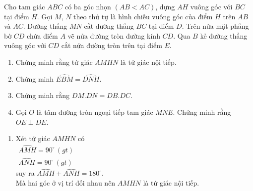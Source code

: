 \begin{bt}%
	Cho tam giác $ABC$ có ba góc nhọn $(AB<AC)$, dựng $AH$ vuông góc với $BC$ tại điểm $H$. Gọi $M$, $N$ theo thứ tự là hình chiếu vuông góc của điểm $H$ trên $AB$ và $AC$. Đường thẳng $MN$ cắt đường thẳng $BC$ tại điểm $D$. Trên nửa mặt phẳng bờ $CD$ chứa điểm $A$ vẽ nửa đường tròn đường kính $CD$. Qua $B$ kẻ đường thẳng vuông góc với $CD$ cắt nửa đường tròn trên tại điểm $E$.
	\begin{enumerate}
		\item Chứng minh rằng tứ giác $AMHN$ là tứ giác nội tiếp.
		\item Chứng minh $\widehat{EBM}=\widehat{DNH}$.
		\item Chứng minh rằng $DM.DN=DB.DC$.
		\item Gọi $O$ là tâm đường tròn ngoại tiếp tam giác $MNE$. Chứng minh rằng $OE\perp DE$.
	\end{enumerate}
	\loigiai
	{
		\begin{center}
		\end{center}
		\begin{enumerate}
			\item Xét tứ giác $AMHN$ có \\
			$
			\begin{aligned}
			\widehat{AMH}=90^\circ\, (gt)\\
			\widehat{ANH}=90^\circ\, (gt)
			\end{aligned}
			$\\
			suy ra $ \widehat{AMH}+ \widehat{ANH}=180^\circ$.\\
			Mà hai góc ở vị trí đối nhau nên $AMHN$ là tứ giác nội tiếp.

\end{enumerate}}
\end{bt}
